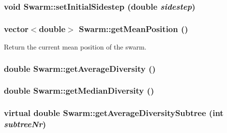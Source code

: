\hypertarget{classSwarm_ba26dbec7b48abc3e5d964ac3b512ed0}{
\subsubsection{\setlength{\rightskip}{0pt plus 5cm}void Swarm::setInitialSidestep (double {\em sidestep})}}
\label{classSwarm_ba26dbec7b48abc3e5d964ac3b512ed0}


\hypertarget{classSwarm_71be1e7ff66391d2f1e12f742ed9794d}{
\subsubsection{\setlength{\rightskip}{0pt plus 5cm}vector$<$double$>$ Swarm::getMeanPosition ()}}
\label{classSwarm_71be1e7ff66391d2f1e12f742ed9794d}


Return the current mean position of the swarm. 

\hypertarget{classSwarm_3f51b2c5d7a170f17b7290857c2ba3cb}{
\subsubsection{\setlength{\rightskip}{0pt plus 5cm}double Swarm::getAverageDiversity ()}}
\label{classSwarm_3f51b2c5d7a170f17b7290857c2ba3cb}


\hypertarget{classSwarm_40ac578ec7abab1bfd2a0d4fc4051811}{
\subsubsection{\setlength{\rightskip}{0pt plus 5cm}double Swarm::getMedianDiversity ()}}
\label{classSwarm_40ac578ec7abab1bfd2a0d4fc4051811}


\hypertarget{classSwarm_71dc0d0753bfea580e841234b9c63ebc}{
\subsubsection{\setlength{\rightskip}{0pt plus 5cm}virtual double Swarm::getAverageDiversitySubtree (int {\em subtreeNr})}}
\label{classSwarm_71dc0d0753bfea580e841234b9c63ebc}




